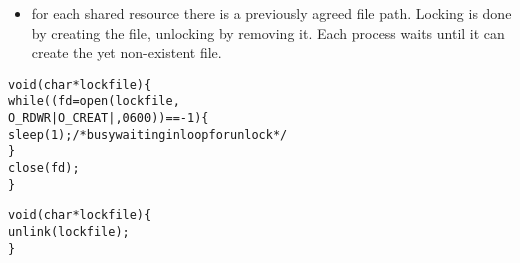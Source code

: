 

\begin{slide}
\begin{itemize}
\item for each shared resource there is a previously agreed file path.  Locking
is done by creating the file, unlocking by removing it.  Each process waits
until it can create the yet non-existent file.
\end{itemize}
\begin{alltt}
void (char *lockfile) \{
        while((fd = open(lockfile,
            O\_RDWR|O\_CREAT|, 0600)) == -1) \{
                sleep(1); {\rm/* busy waiting in loop for unlock */}
        \}
        close(fd);
\}

void (char *lockfile) \{
        unlink(lockfile);
\}
\end{alltt}
\end{slide}


